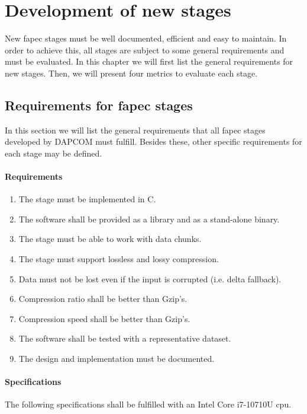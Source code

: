 \chapter{Development of new stages}
New \acrshort{fapec} stages must be well documented, efficient and easy to maintain. In order to achieve this, all stages are subject to some general requirements and must be evaluated. In this chapter we will first list the general requirements for new stages. Then, we will present four metrics to evaluate each stage.

\section{Requirements for \acrshort{fapec} stages} \label{sec:fapec_reqs}
In this section we will list the general requirements that all \acrshort{fapec} stages developed by DAPCOM must fulfill. Besides these, other specific requirements for each stage may be defined.

\subsubsection{Requirements} \label{sec:requirements}
\begin{enumerate}
	\item The stage must be implemented in C. \label{req:c}
	\item The software shall be provided as a library and as a stand-alone binary. \label{req:lib_bin}
	\item The stage must be able to work with data chunks. \label{req:chunks}
	\item The stage must support lossless and lossy compression.
	\item Data must not be lost even if the input is corrupted (i.e. delta fallback).
	\item Compression ratio shall be better than Gzip's.
	\item Compression speed shall be better than Gzip's.
	\item The software shall be tested with a representative dataset.
	\item The design and implementation must be documented.
\end{enumerate}

\subsubsection{Specifications}
The following specifications shall be fulfilled with an Intel Core i7-10710U \acrshort{cpu}.

